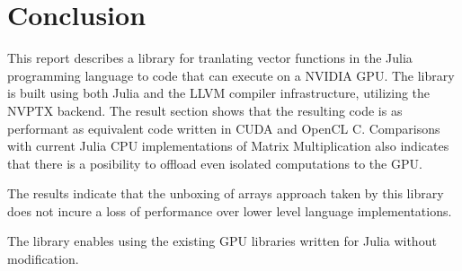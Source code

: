 \chapter{Conclusion}
\begin{markdown}

This report describes a library for tranlating vector functions in the
Julia programming language to code that can execute on a NVIDIA
GPU. The library is built using both Julia and the LLVM compiler
infrastructure, utilizing the NVPTX backend. The result section shows
that the resulting code is as performant as equivalent code written in
CUDA and OpenCL C. Comparisons with current Julia CPU implementations
of Matrix Multiplication also indicates that there is a posibility to
offload even isolated computations to the GPU.

The results indicate that the unboxing of arrays approach taken by
this library does not incure a loss of performance over lower level
language implementations.

The library enables using the existing GPU libraries written for Julia
without modification.

\end{markdown}
